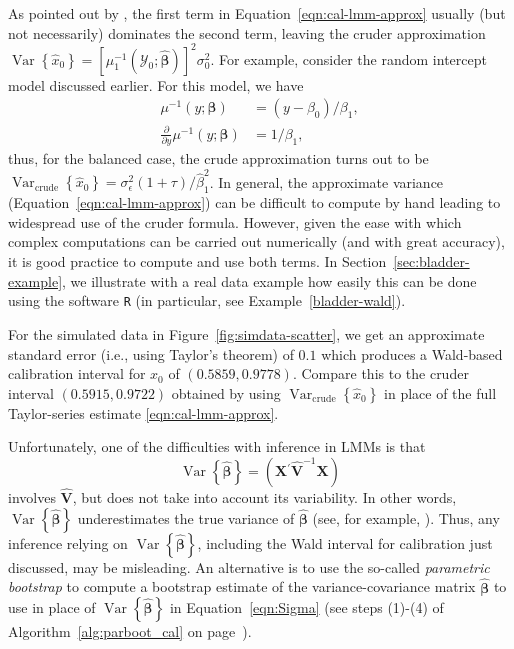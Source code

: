 \documentclass[cmfont,usenames,dvipsnames,leqno]{afit-etd}\usepackage[]{graphicx}\usepackage[]{color}
\newcommand{\code}[1]{\texttt{\small{#1}}}
\newcommand{\trans}{\ensuremath{^\prime}}
\newcommand{\mc}[1]{\ensuremath{\mathcal{#1}}}
\newcommand{\wh}[1]{\ensuremath{\widehat{#1}}}
\newcommand{\var}{\operatorname{Var}}
\newcommand{\X}{\ensuremath{\bm{X}}}
\begin{document}
As pointed out by \citet[p. 283]{davidian_nonlinear_1995}, the first term in Equation~\eqref{eqn:cal-lmm-approx} usually (but not necessarily) dominates the second term, leaving the cruder approximation $\var\left\{\wh{x}_0\right\} = \left[\mu_1^{-1}\left(\mc{Y}_0; \wh{\bm{\beta}}\right)\right]^2\sigma_0^2$. For example, consider the random intercept model discussed earlier. For this model, we have
\begin{align*}
  \mu^{-1}\left(y; \bm{\beta}\right) &= \left(y - \beta_0\right)/\beta_1, \\
  \frac{\partial}{\partial y}\mu^{-1}\left(y; \bm{\beta}\right) &= 1/\beta_1,
\end{align*}
thus, for the balanced case, the crude approximation turns out to be $\var_\mathrm{crude}\left\{\wh{x}_0\right\} = \sigma_\epsilon^2\left(1 + \tau\right)/\wh{\beta}_1^2$. In general, the approximate variance (Equation~\eqref{eqn:cal-lmm-approx}) can be difficult to compute by hand leading to widespread use of the cruder formula. However, given the ease with which complex computations can be carried out numerically (and with great accuracy), it is good practice to compute and use both terms. In Section~\ref{sec:bladder-example}, we illustrate with a real data example how easily this can be done using the software \code{R} (in particular, see Example~\ref{bladder-wald}).

For the simulated data in Figure~\ref{fig:simdata-scatter}, we get an approximate standard error (i.e., using Taylor's theorem) of $0.1$ which produces a Wald-based calibration interval for $x_0$ of $(0.5859, 0.9778)$. Compare this to the cruder interval $(0.5915, 0.9722)$ obtained by using $\var_\mathrm{crude}\left\{\wh{x}_0\right\}$ in place of the full Taylor-series estimate \eqref{eqn:cal-lmm-approx}.

Unfortunately, one of the difficulties with inference in LMMs is that 
\begin{equation*}
  \var\left\{\wh{\bm{\beta}}\right\} = \left(\X\trans\wh{\bm{V}}^{-1}\X\right)  
\end{equation*}  
involves $\wh{\bm{V}}$, but does not take into account its variability. In other words, $\var\left\{\wh{\bm{\beta}}\right\}$ underestimates the true variance of $\wh{\bm{\beta}}$ (see, for example, \citet[pp. 165-167]{mcculloch_generalized_2008}). Thus, any inference relying on $\var\left\{\wh{\bm{\beta}}\right\}$, including the Wald interval for calibration just discussed, may be misleading. An alternative is to use the so-called \textit{parametric bootstrap} to compute a bootstrap estimate of the variance-covariance matrix $\wh{\bm{\beta}}$ to use in place of $\var\left\{\wh{\bm{\beta}}\right\}$ in Equation~\eqref{eqn:Sigma} (see steps (1)-(4) of Algorithm~\ref{alg:parboot_cal} on page~\pageref{alg:parboot_cal}). 
\end{document}
